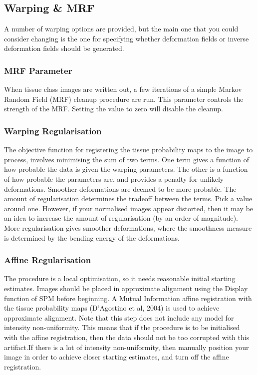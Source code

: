 \subsection{Warping \& MRF}
A number of warping options are provided, but the main one that you could consider changing is the one for specifying whether deformation fields or inverse deformation fields should be generated.


\subsubsection{MRF Parameter}
When tissue class images are written out, a few iterations of a simple Markov Random Field (MRF) cleanup procedure are run.  This parameter controls the strength of the MRF. Setting the value to zero will disable the cleanup.


\subsubsection{Warping Regularisation}
The objective function for registering the tissue probability maps to the image to process, involves minimising the sum of two terms. One term gives a function of how probable the data is given the warping parameters. The other is a function of how probable the parameters are, and provides a penalty for unlikely deformations. Smoother deformations are deemed to be more probable. The amount of regularisation determines the tradeoff between the terms. Pick a value around one.  However, if your normalised images appear distorted, then it may be an idea to increase the amount of regularisation (by an order of magnitude). More regularisation gives smoother deformations, where the smoothness measure is determined by the bending energy of the deformations. 


\subsubsection{Affine Regularisation}
The procedure is a local optimisation, so it needs reasonable initial starting estimates. Images should be placed in approximate alignment using the Display function of SPM before beginning. A Mutual Information affine registration with the tissue probability maps (D'Agostino et al, 2004) is used to achieve approximate alignment. Note that this step does not include any model for intensity non-uniformity. This means that if the procedure is to be initialised with the affine registration, then the data should not be too corrupted with this artifact.If there is a lot of intensity non-uniformity, then manually position your image in order to achieve closer starting estimates, and turn off the affine registration.



